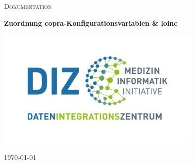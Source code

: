 \begin{titlepage}
	\thispagestyle{firstpage}
	
	\centering
	\vspace*{5cm}
	{\scshape\LARGE Dokumentation \par}
	\vspace{1.5cm}
	{\huge \bfseries Zuordnung \acs*{copra}-Konfigurationsvariablen \& \acs*{loinc}\par}
	\vspace{2cm}
	 \includegraphics[width=10cm]{figures/diz.jpg}
	\vfill
	
	{\large \today\par}
\end{titlepage}